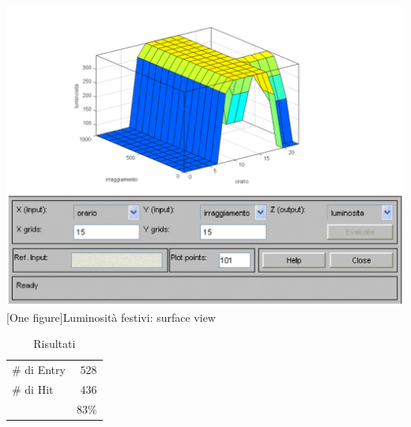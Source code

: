 \includegraphics[scale=0.5]{images/fuzzy/luminosita_festivi_surface_view.pdf}
[One figure]{Luminosità festivi: surface view}
\vspace{20px}
\begin{table}
  \caption{Risultati}
  \centering
	\begin{tabular}{lr}
		\toprule
      \# di Entry & $ 528 $ \\
			\# di Hit   & $ 436 $ \\
		\midrule
			& $ 83\% $ \\
		\bottomrule
	\end{tabular}
\end{table}


